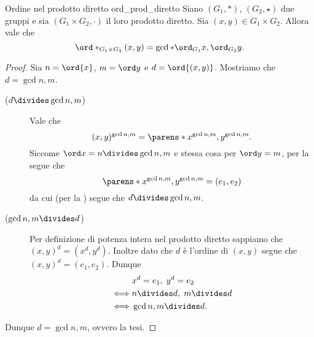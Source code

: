 \begin{proposition}
    {Ordine nel prodotto diretto}
    {ord_prod_diretto}
    Siano $(G_1, \ast)$, $(G_2, \star)$ due gruppi e sia $(G_1 \times G_2, \cdot)$ il loro prodotto diretto. Sia $(x, y) \in G_1 \times G_2$. Allora vale che \[
        \ord*_{ G_1 \times G_2 }{(x, y)} = \gcd*{\ord_{G_1}{x}, \ord_{G_2}{y}}.    
    \]
\end{proposition}
\begin{proof}
    Sia $n = \ord{x}$, $m = \ord y$ e $d = \ord{(x, y)}$. Mostriamo che $d = \gcd{n, m}$.
    \begin{description}
        \item[($d \divides \gcd{n, m}$)] Vale che \[
            (x, y)^{\gcd{n, m}} = \parens*{x^{\gcd{n, m}}, y^{\gcd{n, m}}}.   
        \] Siccome $\ord x = n \divides \gcd{n, m}$ e stessa cosa per $\ord y = m$, per la  segue che \begin{equation*}
            \parens*{x^{\gcd{n, m}}, y^{\gcd{n, m}}} = (e_1, e_2)
        \end{equation*}
        da cui (per la ) segue che $d \divides \gcd{n, m}$.
        \item[($\gcd{n, m} \divides d$)] Per definizione di potenza intera nel prodotto diretto sappiamo che $(x, y)^d = (x^d, y^d)$. Inoltre dato che $d$ è l'ordine di $(x, y)$ segue che $(x, y)^d = (e_1, e_2)$. Dunque \begin{align*}
            &x^d = e_1, \; y^d = e_2\\
            \iff &n \divides d, \; m \divides d \\
            \iff &\gcd{n, m} \divides d.
        \end{align*}
    \end{description}
    Dunque $d = \gcd{n, m}$, ovvero la tesi.
\end{proof}

